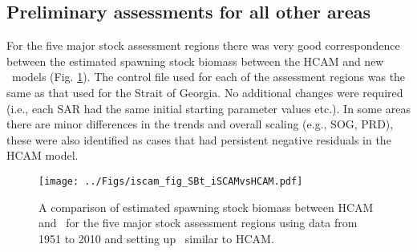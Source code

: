 	
	\subsection{Preliminary assessments for all other areas}
	For the five major stock assessment regions there was very good correspondence between the estimated spawning stock biomass between the HCAM and new \iscam\  models (Fig. \ref{fig:iSCAMvsHCAM}). The control file used for each of the assessment regions was the same as that used for the Strait of Georgia.  No additional changes were required (i.e., each SAR had the same initial starting parameter values etc.).  In some areas there are minor differences in the trends and overall scaling (e.g., SOG, PRD), these were also identified as cases that had persistent negative residuals in the HCAM model.

\begin{figure}[htbp]
	\centering
		\texttt{[image: ../Figs/iscam\_fig\_SBt\_iSCAMvsHCAM.pdf]}\\
	\caption{A comparison of estimated spawning stock biomass between HCAM and \iscam\ for the five major stock assessment regions using data from 1951 to 2010 and setting up \iscam\ similar to HCAM.}
	\label{fig:iSCAMvsHCAM}
\end{figure}

\clearpage
